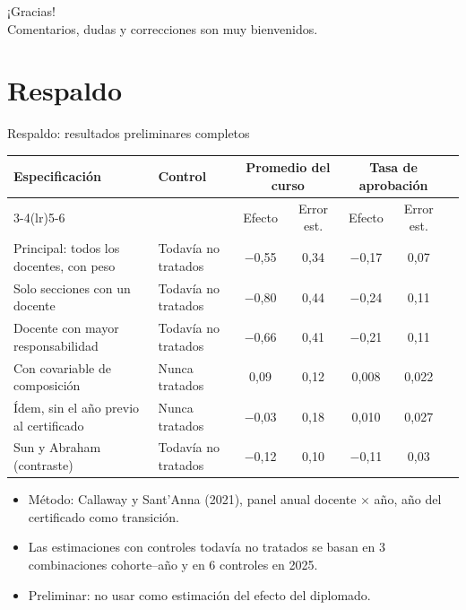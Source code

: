 \documentclass[10pt,aspectratio=169]{beamer}
\begin{document}
\begin{frame}
  \begin{center}
    {\Large ¡Gracias!}\\[1em]
    Comentarios, dudas y correcciones son muy bienvenidos.
  \end{center}
\end{frame}

\appendix
\section*{Respaldo}

\begin{frame}{Respaldo: resultados preliminares completos}
  \begin{table}\scriptsize
    \begin{tabular}{llccccc}
      \toprule
      Especificación & Control & \multicolumn{2}{c}{Promedio del curso} & \multicolumn{2}{c}{Tasa de aprobación} \\
      \cmidrule(lr){3-4}\cmidrule(lr){5-6}
      & & Efecto & Error est. & Efecto & Error est. \\
      \midrule
      Principal: todos los docentes, con peso & Todavía no tratados & $-$0,55 & 0,34 & $-$0,17 & 0,07 \\
      Solo secciones con un docente & Todavía no tratados & $-$0,80 & 0,44 & $-$0,24 & 0,11 \\
      Docente con mayor responsabilidad & Todavía no tratados & $-$0,66 & 0,41 & $-$0,21 & 0,11 \\
      Con covariable de composición & Nunca tratados & 0,09 & 0,12 & 0,008 & 0,022 \\
      Ídem, sin el año previo al certificado & Nunca tratados & $-$0,03 & 0,18 & 0,010 & 0,027 \\
      Sun y Abraham (contraste) & Todavía no tratados & $-$0,12 & 0,10 & $-$0,11 & 0,03 \\
      \bottomrule
    \end{tabular}
  \end{table}
  \vspace{0.3em}
  \begin{itemize}\small
    \item Método: Callaway y Sant'Anna (2021), panel anual docente $\times$ año, año del certificado como transición.
    \item Las estimaciones con controles todavía no tratados se basan en 3 combinaciones cohorte--año y en 6 controles en 2025.
    \item \alert{Preliminar: no usar como estimación del efecto del diplomado.}
  \end{itemize}
\end{frame}
\end{document}
